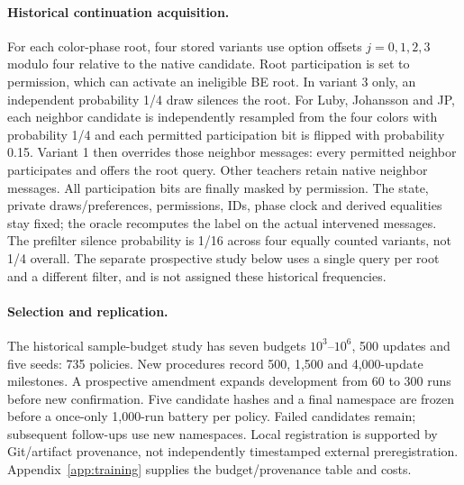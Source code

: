 \documentclass[10pt]{article}
\begin{document}
\paragraph{Historical continuation acquisition.}
For each color-phase root, four stored variants use option offsets
$j=0,1,2,3$ modulo four relative to the native candidate. Root participation
is set to permission, which can activate an ineligible BE root. In variant 3
only, an independent probability 1/4 draw silences the root. For Luby,
Johansson and JP, each neighbor candidate is independently resampled from
the four colors with probability 1/4 and each permitted participation bit
is flipped with probability 0.15. Variant 1 then overrides those neighbor
messages: every permitted neighbor participates and offers the root query.
Other teachers retain native neighbor messages. All participation bits are
finally masked by permission. The state, private draws/preferences,
permissions, IDs, phase clock and derived equalities stay fixed; the oracle
recomputes the label on the actual intervened messages. The prefilter silence
probability is 1/16 across four equally counted variants, not 1/4 overall.
The separate prospective study below uses a single query per root and a
different filter, and is not assigned these historical frequencies.

\paragraph{Selection and replication.}
The historical sample-budget study has seven budgets $10^3$--$10^6$,
500 updates and five seeds: 735 policies. New procedures record 500, 1,500
and 4,000-update milestones. A prospective amendment expands development
from 60 to 300 runs before new confirmation. Five candidate hashes and a
final namespace are frozen before a once-only 1,000-run battery per policy.
Failed candidates remain; subsequent follow-ups use new namespaces. Local
registration is supported by Git/artifact provenance, not independently
timestamped external preregistration. Appendix~\ref{app:training} supplies
the budget/provenance table and costs.


\end{document}
